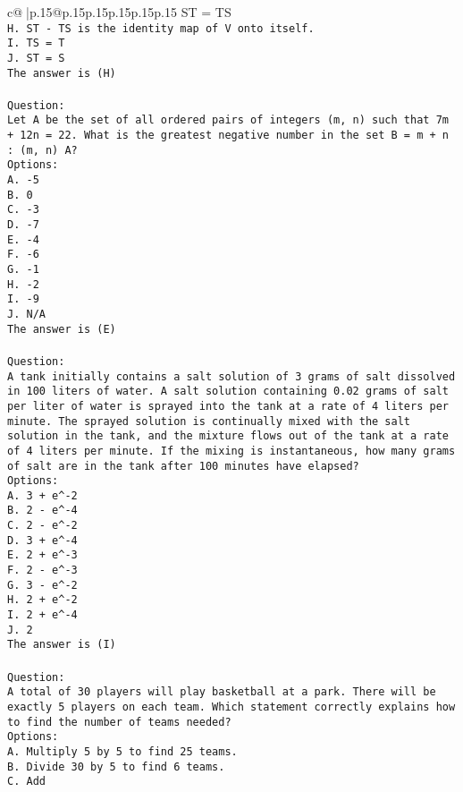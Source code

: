\documentclass{article}
\begin{document}
{\begin{supertabular}{c@{$\;$}|p{.15\linewidth}@{}p{.15\linewidth}p{.15\linewidth}p{.15\linewidth}p{.15\linewidth}p{.15\linewidth}}
{{{ST = TS\\ \tt H. ST - TS is the identity map of V onto itself.\\ \tt I. TS = T\\ \tt J. ST = S\\ \tt The answer is (H)\\ \tt \\ \tt Question:\\ \tt Let A be the set of all ordered pairs of integers (m, n) such that 7m + 12n = 22. What is the greatest negative number in the set B = {m + n : (m, n) \in A}?\\ \tt Options:\\ \tt A. -5\\ \tt B. 0\\ \tt C. -3\\ \tt D. -7\\ \tt E. -4\\ \tt F. -6\\ \tt G. -1\\ \tt H. -2\\ \tt I. -9\\ \tt J. N/A\\ \tt The answer is (E)\\ \tt \\ \tt Question:\\ \tt A tank initially contains a salt solution of 3 grams of salt dissolved in 100 liters of water. A salt solution containing 0.02 grams of salt per liter of water is sprayed into the tank at a rate of 4 liters per minute. The sprayed solution is continually mixed with the salt solution in the tank, and the mixture flows out of the tank at a rate of 4 liters per minute. If the mixing is instantaneous, how many grams of salt are in the tank after 100 minutes have elapsed?\\ \tt Options:\\ \tt A. 3 + e^-2\\ \tt B. 2 - e^-4\\ \tt C. 2 - e^-2\\ \tt D. 3 + e^-4\\ \tt E. 2 + e^-3\\ \tt F. 2 - e^-3\\ \tt G. 3 - e^-2\\ \tt H. 2 + e^-2\\ \tt I. 2 + e^-4\\ \tt J. 2\\ \tt The answer is (I)\\ \tt \\ \tt Question:\\ \tt A total of 30 players will play basketball at a park. There will be exactly 5 players on each team. Which statement correctly explains how to find the number of teams needed?\\ \tt Options:\\ \tt A. Multiply 5 by 5 to find 25 teams.\\ \tt B. Divide 30 by 5 to find 6 teams.\\ \tt C. Add }}}
\end{supertabular}}
\end{document}
